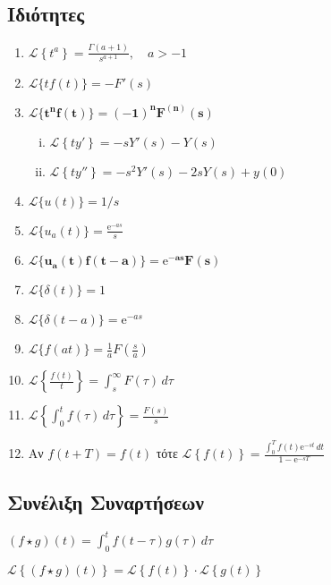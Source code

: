 {  \subsection*{Ιδιότητες}
  \begin{enumerate}
    \item $ \mathcal{L}\left\{t^{a}\right\} = \frac{\Gamma{(a+1)}}{s^{a+1}}, \quad a>-1 $
    \item $ \mathcal{L}\{tf(t)\} = -F'(s) $
    \item $ \bm{\mathcal{L}\{t^{n}f(t)\} = (-1)^{n} F^{(n)}(s)} $
      \begin{enumerate}[i)]
        \item $ \mathcal{L}\left\{ty'\right\} = -sY'(s)-Y(s) $ 
        \item $ \mathcal{L}\left\{ty''\right\} = -s^{2}Y'(s)-2sY(s)+y(0) $ 
      \end{enumerate}
    \item $ \mathcal{L}\{u(t)\} = {1}/{s}$
    \item $ \mathcal{L}\{u_{a}(t)\} = \frac{\mathrm{e}^{-as}}{s}$
    \item $ \bm{\mathcal{L}\{u_{a}(t)f(t-a)\} = \mathrm{e}^{-as}F(s)}$
    \item $ \mathcal{L}\{\delta(t)\} = 1 $
    \item $ \mathcal{L}\{\delta(t-a)\} = \mathrm{e}^{-as} $
    \item $ \mathcal{L}\{f(at)\} = \frac{1}{a} F\left(\frac{s}{a}\right) $
    \item $ \mathcal{L}\left\{\frac{f(t)}{t} \right\} = \int\nolimits _{s}^{\infty} 
      F(\tau) \,{d\tau} $
    \item $ \mathcal{L}\left\{\int\nolimits _{0}^{t} f(\tau) \,{d\tau}\right\} = 
      \frac{F(s)}{s} $
    \item Αν $ f(t+T)=f(t) $ τότε $ \mathcal{L}\left\{f(t)\right\} = \frac{\int _{0}^{T}
        f(t) \mathrm{e}^{-st}
      \,{dt}}{1- \mathrm{e}^{-sT}} $
  \end{enumerate}

  \subsection*{Συνέλιξη Συναρτήσεων}

  \begin{myitemize}
    \item $ (f\star g)(t) = \int _{0}^{t} f(t-\tau) g(\tau) \,{d\tau} $ 
    \item $ \mathcal{L}\left\{(f\star g)(t)\right\} = \mathcal{L}\left\{f(t)\right\}
      \cdot \mathcal{L}\left\{g(t)\right\} $
  \end{myitemize}

}
